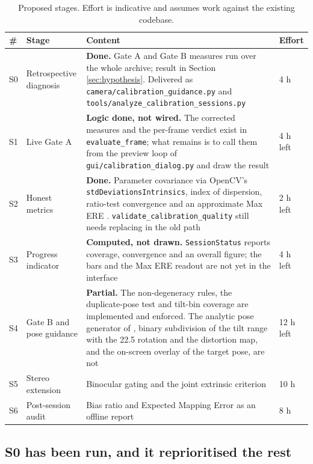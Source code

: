 \begin{table}[!ht]
\centering
\small
\caption[Staged implementation plan]{Proposed stages. Effort is indicative and assumes work against the existing codebase.}
\label{tab:stages}
\begin{tabularx}{\textwidth}{p{} p{} X p{}}
\toprule
\textbf{\#} & \textbf{Stage} & \textbf{Content} & \textbf{Effort} \\
\midrule
S0 & Retrospective diagnosis & \textbf{Done.} Gate A and Gate B measures run over the whole archive; result in Section \ref{sec:hypothesis}. Delivered as \texttt{camera/calibration\_guidance.py} and \texttt{tools/\allowbreak analyze\_calibration\_sessions.py} & 4 h \\
S1 & Live Gate A & \textbf{Logic done, not wired.} The corrected measures and the per-frame verdict exist in \texttt{evaluate\_frame}; what remains is to call them from the preview loop of \texttt{gui/\allowbreak calibration\_dialog.py} and draw the result & 4 h left \\
S2 & Honest metrics & \textbf{Done.} Parameter covariance via OpenCV's \texttt{stdDeviations\allowbreak Intrinsics}, index of dispersion, ratio-test convergence and an approximate Max ERE \cite{richardson2013aprilcal,rojtberg2018pose}. \texttt{validate\_calibration\_quality} still needs replacing in the old path & 2 h left \\
S3 & Progress indicator & \textbf{Computed, not drawn.} \texttt{SessionStatus} reports coverage, convergence and an overall figure; the bars and the Max ERE readout are not yet in the interface & 4 h left \\
S4 & Gate B and pose guidance & \textbf{Partial.} The non-degeneracy rules, the duplicate-pose test and tilt-bin coverage are implemented and enforced. The analytic pose generator of \cite{rojtberg2018pose}, binary subdivision of the tilt range with the 22.5\textdegree{} rotation and the distortion map, and the on-screen overlay of the target pose, are not & 12 h left \\
S5 & Stereo extension & Binocular gating and the joint extrinsic criterion \cite{tan2025stereoposes} & 10 h \\
S6 & Post-session audit & Bias ratio and Expected Mapping Error as an offline report \cite{hagemann2021bias} & 8 h \\
\bottomrule
\end{tabularx}
\end{table}

\subsection{S0 has been run, and it reprioritised the rest}

